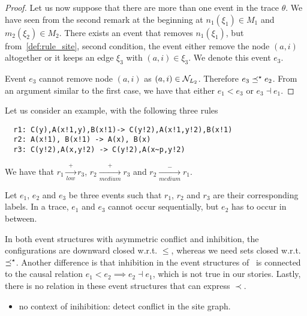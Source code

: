 \begin{proof}
\bigskip

Let us now suppose that there are more than one event in the trace $\theta$. We have seen from the second remark at the beginning at $n_1(\xi_1)\in M_1$ and $m_2(\xi_2)\in M_2$. There exists an event that removes $n_1(\xi_1)$, but from~\autoref{def:rule_site}, second condition, the event either remove the node $(a,i)$ altogether or it keeps an edge $\xi_3$ with $(a,i)\in\xi_3$.
We denote this event $e_3$.

Event $e_3$ cannot remove node $(a,i)$ as $(a,i)\in \mathcal{N}_{L_2}$. Therefore $e_3\preceq^{\star} e_2$. From an argument similar to the first case, we have that either $e_1< e_3$ or $e_3\dashv e_1$.
\end{proof}

\begin{example}
Let us consider an example, with the following three rules
\begin{verbatim}
  r1: C(y),A(x!1,y),B(x!1)-> C(y!2),A(x!1,y!2),B(x!1)
  r2: A(x!1), B(x!1) -> A(x), B(x)
  r3: C(y!2),A(x,y!2) -> C(y!2),A(x~p,y!2)
\end{verbatim}

We have that $r_1\xrightarrow[low]{+} r_3$, $r_2\xrightarrow[medium]{+} r_3$ and $r_2\xrightarrow[medium]{-} r_1$.

Let $e_1$, $e_2$ and $e_3$ be three events such that $r_1$, $r_2$ and $r_3$ are their corresponding labels.
In a trace, $e_1$ and $e_3$ cannot occur sequentially, but $e_2$ has to occur in between.
\end{example}

\begin{remark}
  In both event structures with asymmetric conflict and inhibition, the configurations are downward closed w.r.t. $\leq$, whereas we need sets closed w.r.t. $\preceq^{\star}$. Another difference is that inhibition in the event structures of~\cite{BaldanThesis} is connected to the causal relation $e_1 < e_2 \implies e_2\dashv e_1$, which is not true in our stories. Lastly, there is no relation in these event structures that can express $\prec$.
\end{remark}

\begin{mdframed}[backgroundcolor=blue!20]
  \begin{itemize}
  \item no context of inihibition: detect conflict in the site graph.
  \end{itemize}
\end{mdframed}
